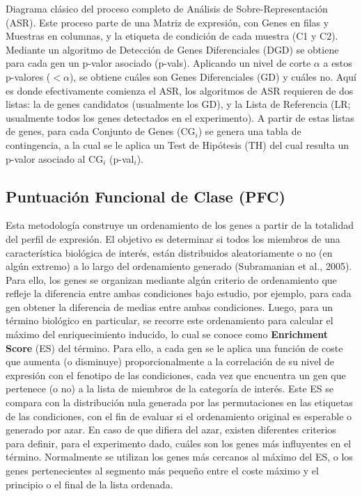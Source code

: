\documentclass[12pt,twoside]{reedthesis}
\begin{document}
\newpage

Diagrama clásico del proceso completo de Análisis de Sobre-Representación (ASR). Este proceso parte de una Matriz de expresión, con Genes en filas y Muestras en columnas, y la etiqueta de condición de cada muestra (C1 y C2). Mediante un algoritmo de Detección de Genes Diferenciales (DGD) se obtiene para cada gen un p-valor asociado (p-vals). Aplicando un nivel de corte \(\alpha\) a estos p-valores (\(< \alpha\)), se obtiene cuáles son Genes Diferenciales (GD) y cuáles no. Aquí es donde efectivamente comienza el ASR, los algoritmos de ASR requieren de dos listas: la de genes candidatos (usualmente los GD), y la Lista de Referencia (LR; usualmente todos los genes detectados en el experimento). A partir de estas listas de genes, para cada Conjunto de Genes (CG\(_i\)) se genera una tabla de contingencia, a la cual se le aplica un Test de Hipótesis (TH) del cual resulta un p-valor asociado al CG\(_i\) (p-val\(_i\)).



\hypertarget{puntuaciuxf3n-funcional-de-clase-pfc}{%
\subsection{Puntuación Funcional de Clase (PFC)}\label{puntuaciuxf3n-funcional-de-clase-pfc}}

Esta metodología construye un ordenamiento de los genes a partir de la totalidad del perfil de expresión. El objetivo es determinar si todos los miembros de una característica biológica de interés, están distribuidos aleatoriamente o no (en algún extremo) a lo largo del ordenamiento generado (Subramanian et al., 2005). Para ello, los genes se organizan mediante algún criterio de ordenamiento que refleje la diferencia entre ambas condiciones bajo estudio, por ejemplo, para cada gen obtener la diferencia de medias entre ambas condiciones. Luego, para un término biológico en particular, se recorre este ordenamiento para calcular el máximo del enriquecimiento inducido, lo cual se conoce como \textbf{Enrichment Score} (ES) del término. Para ello, a cada gen se le aplica una función de coste que aumenta (o disminuye) proporcionalmente a la correlación de su nivel de expresión con el fenotipo de las condiciones, cada vez que encuentra un gen que pertenece (o no) a la lista de miembros de la categoría de interés. Este ES se compara con la distribución nula generada por las permutaciones en las etiquetas de las condiciones, con el fin de evaluar si el ordenamiento original es esperable o generado por azar. En caso de que difiera del azar, existen diferentes criterios para definir, para el experimento dado, cuáles son los genes más influyentes en el término. Normalmente se utilizan los genes más cercanos al máximo del ES, o los genes pertenecientes al segmento más pequeño entre el coste máximo y el principio o el final de la lista ordenada.
\end{document}

